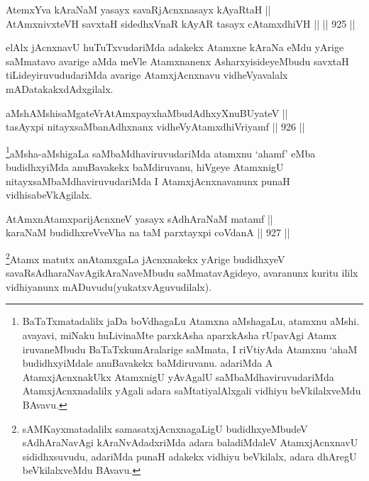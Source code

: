 \begin{shl}
AtemxYva kAraNaM yasayx savaRjAcnxnasayx kAyaRtaH || \\
AtAmxnivxteVH savxtaH sidedhxVnaR kAyAR tasayx cA\s \s tamxdhiVH ||  \hfill || 925 ||  
\end{shl}

\begin{artha}
elAlx jAcnxnavU huTuTxvudariMda adakekx Atamxne kAraNa eMdu yArige saMmatavo avarige aMda meVle Atamxnanenx AsharxyisideyeMbudu savxtaH tiLideyiruvududariMda avarige AtamxjAcnxnavu vidheVyavalalx mADatakakxdAdxgilalx.
\end{artha}


\begin{shl}
aMshAMshisaMgateVrAtAmx\s payxhaMbudAdhxyX\s nuBUyateV || \\
tasAyxpi nitayxsaMbanAdhxnanx vidheVyA\s \s tamxdhiVriyamf \hfill || 926 ||  
\end{shl}

\begin{artha}
\footnote{BaTaTxmatadalilx jaDa boVdhagaLu Atamxna aMshagaLu, atamxnu aMshi. avayavi, miNaku huLivinaMte parxkAsha aparxkAsha rUpavAgi Atamx iruvaneMbudu BaTaTxkumAralarige saMmata, I riVtiyAda Atamxnu `ahaM budidhxyiMdale anuBavakekx baMdiruvanu. adariMda A AtamxjAcnxnakUkx AtamxnigU yAvAgalU saMbaMdhaviruvudariMda AtamxjAcnxnadalilx yAgali adara saMtatiyalAlxgali vidhiyu beVkilalxveMdu BAvavu.}aMsha-aMshigaLa saMbaMdhaviruvudariMda atamxnu `ahamf' eMba budidhxyiMda anuBavakekx baMdiruvanu, hiVgeye AtamxnigU nitayxsaMbaMdhaviruvudariMda I AtamxjAcnxnavanunx punaH vidhisabeVkAgilalx.
\end{artha}


\begin{shl}
AtAmxnAtamxparijAcnxneV yasayx sAdhAraNaM matamf || \\
karaNaM budidhxreVveVha na taM parxtayxpi coVdanA \hfill || 927 ||  
\end{shl}

\begin{artha}
\footnote{sAMKayxmatadalilx samasatxjAcnxnagaLigU budidhxyeMbudeV sAdhAraNavAgi kAraNvAdadxriMda adara baladiMdaleV AtamxjAcnxnavU sididhxsuvudu, adariMda punaH adakekx vidhiyu beVkilalx, adara dhAregU beVkilalxveMdu BAvavu.}Atamx matutx anAtamxgaLa jAcnxnakekx yArige budidhxyeV savaRsAdharaNavAgikAraNaveMbudu saMmatavAgideyo, avaranunx kuritu ililx vidhiyanunx mADuvudu(yukatxvAguvudilalx).
\end{artha}

